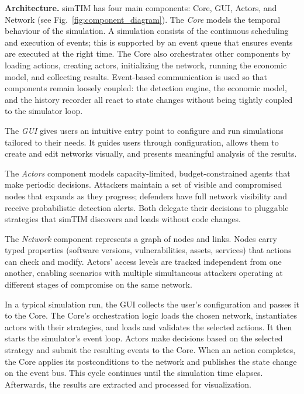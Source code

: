 \documentclass{llncs}
\begin{document}
\textbf{Architecture.}
simTIM has four main components: Core, GUI, Actors, and Network (see Fig.\ \ref{fig:component_diagram}).
The \emph{Core} models the temporal behaviour of the simulation. A simulation consists of the continuous scheduling and execution of events; this is supported by an event queue that ensures events are executed at the right time. The Core also orchestrates other components by loading actions, creating actors, initializing the network, running the economic model, and collecting results. Event-based communication is used so that components remain loosely coupled: the detection engine, the economic model, and the history recorder all react to state changes without being tightly coupled to the simulator loop.

The \emph{GUI} gives users an intuitive entry point to configure and run simulations tailored to their needs. It guides users through configuration, allows them to create and edit networks visually, and presents meaningful analysis of the results.

The \emph{Actors} component models capacity-limited, budget-constrained agents that make periodic decisions. Attackers maintain a set of visible and compromised nodes that expands as they progress; defenders have full network visibility and receive probabilistic detection alerts. Both delegate their decisions to pluggable strategies that simTIM discovers and loads without code changes.

The \emph{Network} component represents a graph of nodes and links. Nodes carry typed properties (software versions, vulnerabilities, assets, services) that actions can check and modify. Actors' access levels are tracked independent from one another, enabling scenarios with multiple simultaneous attackers operating at different stages of compromise on the same network.

In a typical simulation run, %
the GUI collects the user's configuration and passes it to the Core. The Core's orchestration logic loads the chosen network, instantiates actors with their strategies, and loads and validates the selected actions. It then starts the simulator's event loop. Actors make decisions based on the selected strategy and submit the resulting events to the Core. When an action completes, the Core applies its postconditions to the network and publishes the state change on the event bus. This cycle continues until the simulation time elapses. Afterwards, %
the results are extracted and processed for visualization.
\end{document}
